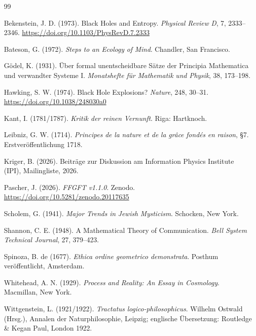 \begin{thebibliography}{99}

Bekenstein, J. D. (1973). Black Holes and Entropy. \emph{Physical Review D}, 7, 2333--2346. \url{https://doi.org/10.1103/PhysRevD.7.2333}

Bateson, G. (1972). \emph{Steps to an Ecology of Mind}. Chandler, San Francisco.

Gödel, K. (1931). Über formal unentscheidbare Sätze der Principia Mathematica und verwandter Systeme I. \emph{Monatshefte für Mathematik und Physik}, 38, 173--198.

Hawking, S. W. (1974). Black Hole Explosions? \emph{Nature}, 248, 30--31. \url{https://doi.org/10.1038/248030a0}

Kant, I. (1781/1787). \emph{Kritik der reinen Vernunft}. Riga: Hartknoch.

Leibniz, G. W. (1714). \emph{Principes de la nature et de la grâce fondés en raison}, §7. Erstveröffentlichung 1718.

Kriger, B. (2026). Beiträge zur Diskussion am Information Physics Institute (IPI), Mailingliste, 2026.

Pascher, J. (2026). \emph{FFGFT v1.1.0}. Zenodo. \url{https://doi.org/10.5281/zenodo.20117635}

Scholem, G. (1941). \emph{Major Trends in Jewish Mysticism}. Schocken, New York.

Shannon, C. E. (1948). A Mathematical Theory of Communication. \emph{Bell System Technical Journal}, 27, 379--423.

Spinoza, B. de (1677). \emph{Ethica ordine geometrico demonstrata}. Posthum veröffentlicht, Amsterdam.

Whitehead, A. N. (1929). \emph{Process and Reality: An Essay in Cosmology}. Macmillan, New York.

Wittgenstein, L. (1921/1922). \emph{Tractatus logico-philosophicus}. Wilhelm Ostwald (Hrsg.), Annalen der Naturphilosophie, Leipzig; englische Übersetzung: Routledge \& Kegan Paul, London 1922.

\end{thebibliography}

